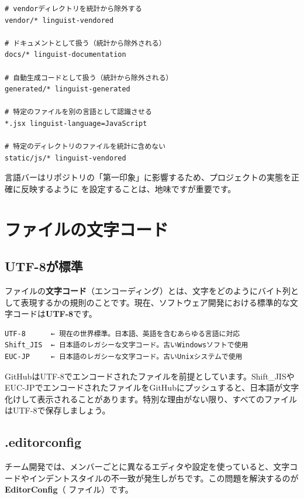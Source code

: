 \begin{lstlisting}[language={}]
# vendorディレクトリを統計から除外する
vendor/* linguist-vendored

# ドキュメントとして扱う（統計から除外される）
docs/* linguist-documentation

# 自動生成コードとして扱う（統計から除外される）
generated/* linguist-generated

# 特定のファイルを別の言語として認識させる
*.jsx linguist-language=JavaScript

# 特定のディレクトリのファイルを統計に含めない
static/js/* linguist-vendored
\end{lstlisting}

言語バーはリポジトリの「第一印象」に影響するため、プロジェクトの実態を正確に反映するように  を設定することは、地味ですが重要です。

\section{ファイルの文字コード}

\subsection{UTF-8が標準}

ファイルの\textbf{文字コード}（エンコーディング）とは、文字をどのようにバイト列として表現するかの規則のことです。現在、ソフトウェア開発における標準的な文字コードは\textbf{UTF-8}です。

\begin{lstlisting}[language={}]
UTF-8      ← 現在の世界標準。日本語、英語を含むあらゆる言語に対応
Shift_JIS  ← 日本語のレガシーな文字コード。古いWindowsソフトで使用
EUC-JP     ← 日本語のレガシーな文字コード。古いUnixシステムで使用
\end{lstlisting}

GitHubはUTF-8でエンコードされたファイルを前提としています。Shift\_JISやEUC-JPでエンコードされたファイルをGitHubにプッシュすると、日本語が文字化けして表示されることがあります。特別な理由がない限り、すべてのファイルはUTF-8で保存しましょう。

\subsection{.editorconfig}

チーム開発では、メンバーごとに異なるエディタや設定を使っていると、文字コードやインデントスタイルの不一致が発生しがちです。この問題を解決するのが\textbf{EditorConfig}（ ファイル）です。

